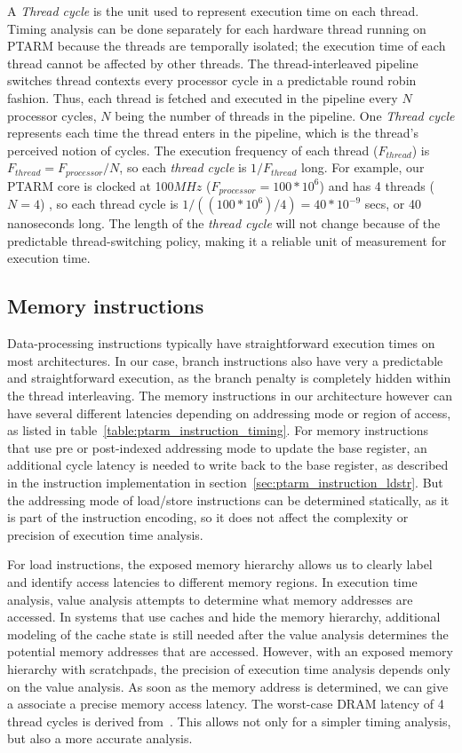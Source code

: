 A \emph{Thread cycle} is the unit used to represent execution time on each thread.  
Timing analysis can be done separately for each hardware thread running on PTARM because the threads are temporally isolated; the execution time of each thread cannot be affected by other threads.
The thread-interleaved pipeline switches thread contexts every processor cycle in a predictable round robin fashion. 
Thus, each thread is fetched and executed in the pipeline every $N$ processor cycles, $N$ being the number of threads in the pipeline.
One \emph{Thread cycle} represents each time the thread enters in the pipeline, which is the thread's perceived notion of cycles.
The execution frequency of each thread ($F_{thread}$) is $F_{thread} = F_{processor}/N$, so each \emph{thread cycle} is $1/F_{thread}$ long. 
For example, our PTARM core is clocked at 100$MHz$ ($F_{processor} = 100 * 10^6$) and has 4 threads ($N=4$) , so each thread cycle is $1/((100 * 10^6)/4) = 40 * 10^{-9}$ secs, or 40 nanoseconds long.
The length of the \emph{thread cycle} will not change because of the predictable thread-switching policy, making it a reliable unit of measurement for execution time.   


\subsection{Memory instructions}
Data-processing instructions typically have straightforward execution times on most architectures.
In our case, branch instructions also have very a predictable and straightforward execution, as the branch penalty is completely hidden within the thread interleaving.
The memory instructions in our architecture however can have several different latencies depending on addressing mode or region of access, as listed in table~\ref{table:ptarm_instruction_timing}.
For memory instructions that use pre or post-indexed addressing mode to update the base register, an additional cycle latency is needed to write back to the base register, as described in the instruction implementation in section~\ref{sec:ptarm_instruction_ldstr}.
But the addressing mode of load/store instructions can be determined statically, as it is part of the instruction encoding, so it does not affect the complexity or precision of execution time analysis. 

For load instructions, the exposed memory hierarchy allows us to clearly label and identify access latencies to different memory regions.
In execution time analysis, value analysis attempts to determine what memory addresses are accessed.     
In systems that use caches and hide the memory hierarchy, additional modeling of the cache state is still needed after the value analysis determines the potential memory addresses that are accessed.
However, with an exposed memory hierarchy with scratchpads, the precision of execution time analysis depends only on the value analysis. 
As soon as the memory address is determined, we can give a associate a precise memory access latency.
The worst-case DRAM latency of 4 thread cycles is derived from~\cite{ReinekeLiuPatelKimLee11_PRETDRAMControllerBankPrivatizationForPredictability}. 
This allows not only for a simpler timing analysis, but also a more accurate analysis.

